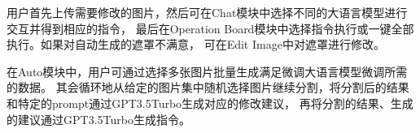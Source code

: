 \documentclass[a4paper,AutoFakeBold,oneside,12pt]{book}
\begin{document}
用户首先上传需要修改的图片，然后可在Chat模块中选择不同的大语言模型进行交互并得到相应的指令，
最后在Operation Board模块中选择指令执行或一键全部执行。如果对自动生成的遮罩不满意，
可在Edit Image中对遮罩进行修改。

在Auto模块中，用户可通过选择多张图片批量生成满足微调大语言模型微调所需的数据。
其会循环地从给定的图片集中随机选择图片继续分割，将分割后的结果和特定的prompt通过GPT3.5Turbo生成对应的修改建议，
再将分割的结果、生成的建议通过GPT3.5Turbo生成指令。

\end{document}

